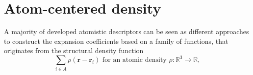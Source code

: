 \section{Atom-centered density}
\label{sec:environment}
A majority of developed atomistic descriptors can be seen as different approaches to construct the expansion coefficients based on a family of functions, that originates from the structural density function~\cite{musil2021physics} 
\begin{equation}
  \label{eq:basis_expansion}
  \sum_{i\in A} \rho(\mathbf{r}-\mathbf{r}_i)\text{ for an atomic density }\rho:\mathbb{R}^3\rightarrow\mathbb{R},
\end{equation}

